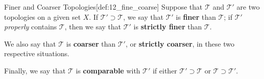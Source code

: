 \begin{defBox}{Finer and Coarser Topologies}[def:12_fine_coarse]
    Suppose that \( \mathcal{T} \) and \( \mathcal{T}' \) are two topologies on a given set \( X \). If
    \( \mathcal{T}' \supset \mathcal{T} \), we say that \( \mathcal{T}' \) is \textbf{finer} than \( \mathcal{T} \); if
    \( \mathcal{T}' \) \textit{properly} contains \( \mathcal{T} \), then we say that \( \mathcal{T}' \) is
    \textbf{strictly finer} than \( \mathcal{T} \).

    \baseSkip

    We also say that \( \mathcal{T} \) is \textbf{coarser} than \( \mathcal{T}' \), or \textbf{strictly coarser},
    in these two respective situations.

    \baseSkip

    Finally, we say that \( \mathcal{T} \) is \textbf{comparable} with \( \mathcal{T}' \) if either
    \( \mathcal{T}' \supset \mathcal{T} \) or \( \mathcal{T} \supset \mathcal{T}' \).
\end{defBox}